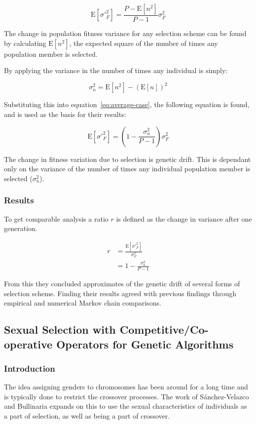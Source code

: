 \documentclass[10pt, a4paper]{article}
\begin{document}
\begin{equation}
\text{E}[\sigma'^2_F] = \frac{P - \text{E}[n^2]}{P-1}\sigma^2_F
\label{eq:average-case}
\end{equation}

The change in population fitness variance for any selection scheme can be found
by calculating $\text{E}[n^2]$, the expected square of the number of times any
population member is selected.

By applying the variance in the number of times any individual is simply:

\begin{equation}
\sigma^2_n = \text{E}[n^2] - (\text{E}[n])^2
\end{equation}

Substituting this into equation~\ref{eq:average-case}, the following equation
is found, and is used as the basis for their results:

\begin{equation}
\text{E}[\sigma'^2_F] = \left( 1 - \frac{\sigma^2_n}{P-1}\right) \sigma^2_F
\end{equation}

The change in fitness variation due to selection is genetic drift. This is
dependant only on the variance of the number of times any individual population
member is selected ($\sigma^2_n$).

\subsubsection{Results} 
To get comparable analysis a ratio $r$ is defined as the change in variance 
after one generation.

\begin{align}
r &= \frac{\text{E}[\sigma'^2_F]}{\sigma^2_F} \\
  &= 1-\frac{\sigma^2_n}{P-1}
\end{align}

From this they concluded approximates of the genetic drift of several forms of
selection scheme. Finding their results agreed with previous findings through
empirical and numerical Markov chain comparisons\cite{Schaffer1998Effect}.


\subsection{Sexual Selection with Competitive/Co-operative Operators for Genetic Algorithms}

\subsubsection{Introduction}
The idea assigning genders to chromosomes has been around for a long time%
and is typically done to restrict the crossover processes. The work of
S\'anchez-Velazco and Bullinaria\cite{SanchezVelazco2003Sexual} expands on this
to use the sexual characteristics of individuals as a part of selection, as 
well as being a part of crossover.
\end{document}
